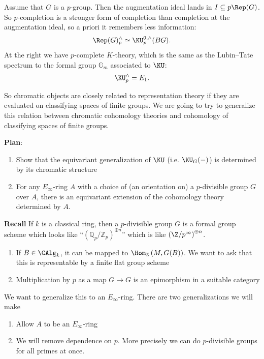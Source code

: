 Assume that $G$ is a $p$-group. Then the augmentation ideal lands in $I \subseteq p \Rep(G)$. So $p$-completion is a stronger form of completion than completion at the augmentation ideal, so a priori it remembers less information:
\begin{align*}
    \Rep(G)_p^\wedge \simeq \KU_p^{0,\wedge}(BG).
\end{align*}
At the right we have $p$-complete $K$-theory, which is the same as the Lubin--Tate spectrum to the formal group $\mathbb{G}_m$ associated to $\KU$:
\begin{align*}
    \KU_p^\wedge = E_1.
\end{align*}

So chromatic objects are closely related to representation theory if they are evaluated on classifying spaces of finite groups. We are going to try to generalize this relation between chromatic cohomology theories and cohomology of classifying spaces of finite groups.

\textbf{Plan}:
\begin{enumerate}
    \item Show that the equivariant generalization of $\KU$ (i.e. $\KU_G(-)$) is determined by its chromatic structure
    \item For any $E_\infty$-ring $A$ with a choice of (an orientation on) a $p$-divisible group $G$ over $A$, there is an equivariant extension of the cohomology theory determined by $A$.
\end{enumerate}


\textbf{Recall} If $k$ is a classical ring, then a $p$-divisible group $G$ is a formal group scheme which looks like ``$\left( \mathbb{Q}_p / \mathbb{Z}_p \right)^{\oplus n}$'' which is like $\left( \Z/p^\infty \right)^{\oplus n}$.
\begin{enumerate}
    \item If $B \in \CAlg_k$, it can be mapped to $\Hom_\mathbb{Z} \left( M, G(B) \right)$. We want to ask that this is representable by a finite flat group scheme
    \item Multiplication by $p$ as a map $G \to G$ is an epimorphism in a suitable category
\end{enumerate}

We want to generalize this to an $E_\infty$-ring. There are two generalizations we will make
\begin{enumerate}
    \item Allow $A$ to be an $E_\infty$-ring
    \item We will remove dependence on $p$. More precisely we can do $p$-divisible groups for all primes at once.
\end{enumerate}

